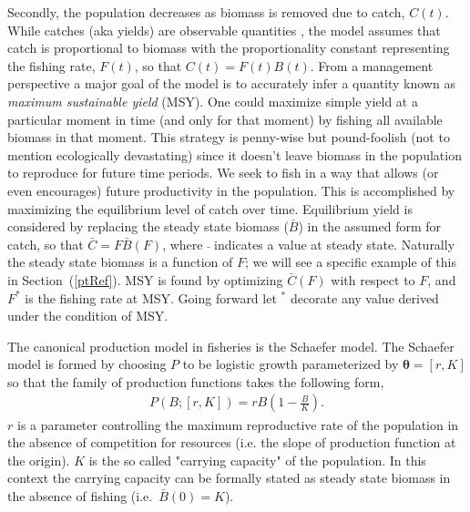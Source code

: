 \documentclass[12pt]{article}
\begin{document}
%
Secondly, the population decreases as biomass is removed due to catch, $C(t)$. 
While catches (aka yields) are observable quantities , %
the model assumes that catch is proportional to biomass with the 
proportionality constant representing the fishing rate, $F(t)$, so that $C(t)=F(t)B(t)$. 
From a management perspective a major goal of the model is to accurately infer 
a quantity known as \emph{maximum sustainable yield} (MSY). One could maximize 
simple yield at a particular moment in time (and only for that moment) by 
fishing all available biomass in that moment. This strategy is penny-wise but 
pound-foolish (not to mention ecologically devastating) since it doesn't leave 
biomass in the population to reproduce for future time periods. We seek to 
fish in a way that allows (or even encourages) future productivity in the 
population. This is accomplished by maximizing the equilibrium level of catch 
over time. Equilibrium yield is considered by replacing the steady state 
biomass ($\bar B$) in the assumed form for catch, so that $\bar C = F\bar B(F)$, 
where $\bar~$ indicates a value at steady state.  Naturally the steady state 
biomass is a function of $F$; we will see a specific example of this in 
\mbox{Section (\ref{ptRef}).} MSY is found by optimizing $\bar C(F)$ with respect to 
$F$, and $F^*$ is the fishing rate at MSY. Going forward let $^*$ decorate any 
value derived under the condition of MSY.  


%

%
The canonical production model in fisheries is the Schaefer model. The 
Schaefer model is formed by choosing $P$ to be logistic growth  %
parameterized by $\bm{\theta} = [r, K]$ so that the family of production 
functions takes the following form,  
%
\begin{align}
P(B; [r, K]) = r B \left(1-\frac{B}{K}\right). \label{logistic}
\end{align}
$r$ is a parameter controlling the maximum reproductive rate of the population 
in the absence of competition for resources (i.e. the slope of production 
function at the origin). $K$ is the so called "carrying capacity" of the 
population. In this context the carrying capacity can be formally stated as 
steady state biomass in the absence of fishing \mbox{(i.e. $\bar B(0)=K$).}  
\end{document}
